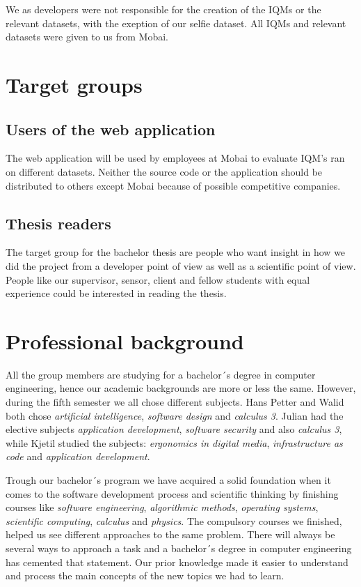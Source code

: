 We as developers were not responsible for the creation of the IQMs or the relevant datasets, with the exeption of our selfie dataset. All IQMs and relevant datasets were given to us from Mobai.

\section{Target groups}
\subsection{Users of the web application}
The web application will be used by employees at Mobai to evaluate IQM's ran on different datasets. Neither the source code or the application should be distributed to others except Mobai because of possible competitive companies.

\subsection{Thesis readers}
The target group for the bachelor thesis are people who want insight in how we did the project from a developer point of view as well as a scientific point of view. People like our supervisor, sensor, client and fellow students with equal experience could be interested in reading the thesis.

\section{Professional background}
All the group members are studying for a bachelor´s degree in computer engineering, hence our academic backgrounds are more or less the same. However, during the fifth semester we all chose different subjects. Hans Petter and Walid both chose \textit{artificial intelligence}, \textit{software design} and \textit{calculus 3}. Julian had the elective subjects \textit{application development}, \textit{software security} and also \textit{calculus 3}, while Kjetil studied the subjects: \textit{ergonomics in digital media}, \textit{infrastructure as code} and \textit{application development}. 

Trough our bachelor´s program we have acquired a solid foundation when it comes to the software development process and scientific thinking by finishing courses like \textit{software engineering}, \textit{algorithmic methods}, \textit{operating systems}, \textit{scientific computing}, \textit{calculus} and \textit{physics}. The compulsory courses we finished, helped us see different approaches to the same problem. There will always be several ways to approach a task and a bachelor´s degree in computer engineering has cemented that statement. Our prior knowledge made it easier to understand and process the main concepts of the new topics we had to learn. 

